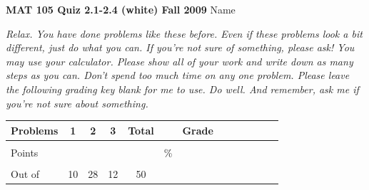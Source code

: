\documentclass[12pt]{article}
\begin{document}
{\bf MAT 105 Quiz 2.1-2.4 (white) Fall 2009} \hspace{.4in} {\large Name} \hrulefill

\hrulefill

 \emph{Relax.  You have done problems like these before.  Even if these problems look a bit different, just do what you can.  If you're not sure of something, please ask! You may use your calculator.  Please show all of your work and write down as many steps as you can.  Don't spend too much time on any one problem.  Please leave the following grading key blank for me to use.  Do well.  And remember, ask me if you're not sure about something.}

\begin{center}

\begin{tabular}
{|l|c|c|c|c|c|c|c|c|c|c|c|c|} \hline

 Problems & \hspace{5 pt} 1 \hspace{5 pt}  & \hspace{5 pt} 2 \hspace{5 pt} & \hspace{5 pt} 3 \hspace{5 pt} &  \hspace{5 pt} Total  \hspace{5 pt} & &  \hspace{5 pt} Grade \hspace{5 pt}  \\ \hline
&&&&&&\\  
Points &&&&&    \hspace{.8in}\% &  \\ 
&&&&&& \\  \hline
Out of & 10 & 28 & 12 &50 & & \\ \hline

\end {tabular}

\end{center}

\hrulefill
\end{document}

